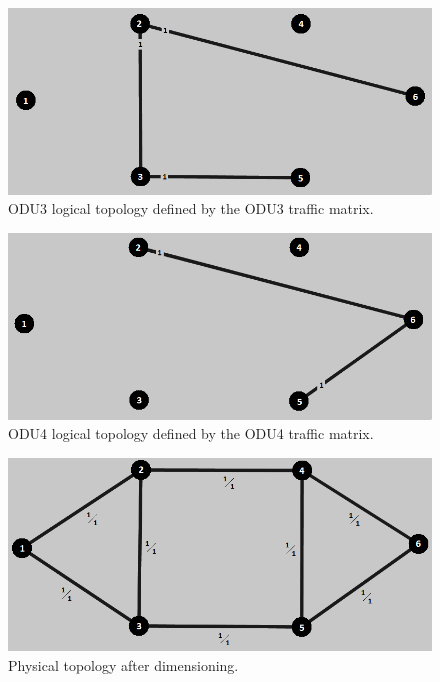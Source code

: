 \begin{figure}[H]
\centering
\includegraphics[width=13cm]{sdf/heuristic/opaque_protection/low/logical_topology_odu3_low}
\caption{ODU3 logical topology defined by the ODU3 traffic matrix.}
\label{logical_ODU3_protec_ref_low_heuristic}
\end{figure}

\begin{figure}[H]
\centering
\includegraphics[width=13cm]{sdf/heuristic/opaque_protection/low/logical_topology_odu4_low}
\caption{ODU4 logical topology defined by the ODU4 traffic matrix.}
\label{logical_ODU4_protec_ref_low_heuristic}
\end{figure}

\begin{figure}[H]
\centering
\includegraphics[width=13cm]{sdf/heuristic/opaque_protection/low/physical_topology_low}
\caption{Physical topology after dimensioning.}
\label{physical_topology_protec_ref_low_heuristic}
\end{figure}

